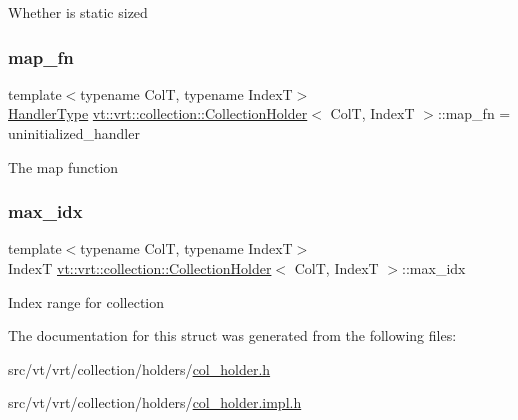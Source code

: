Whether is static sized \mbox{\label{structvt_1_1vrt_1_1collection_1_1_collection_holder_a1bacbcdc0af1d6a69abf890304c78233}} 
\subsubsection{\texorpdfstring{map\+\_\+fn}{map\_fn}}
{\footnotesize\ttfamily template$<$typename ColT, typename IndexT$>$ \\
\hyperlink{namespacevt_af64846b57dfcaf104da3ef6967917573}{Handler\+Type} \hyperlink{structvt_1_1vrt_1_1collection_1_1_collection_holder}{vt\+::vrt\+::collection\+::\+Collection\+Holder}$<$ ColT, IndexT $>$\+::map\+\_\+fn = uninitialized\+\_\+handler}

The map function \mbox{\label{structvt_1_1vrt_1_1collection_1_1_collection_holder_a1d6e15b6f578ae048c11c2c367651f00}} 
\subsubsection{\texorpdfstring{max\+\_\+idx}{max\_idx}}
{\footnotesize\ttfamily template$<$typename ColT, typename IndexT$>$ \\
IndexT \hyperlink{structvt_1_1vrt_1_1collection_1_1_collection_holder}{vt\+::vrt\+::collection\+::\+Collection\+Holder}$<$ ColT, IndexT $>$\+::max\+\_\+idx}

Index range for collection 

The documentation for this struct was generated from the following files\+:\begin{DoxyCompactItemize}
\item 
src/vt/vrt/collection/holders/\hyperlink{col__holder_8h}{col\+\_\+holder.\+h}\item 
src/vt/vrt/collection/holders/\hyperlink{col__holder_8impl_8h}{col\+\_\+holder.\+impl.\+h}\end{DoxyCompactItemize}
